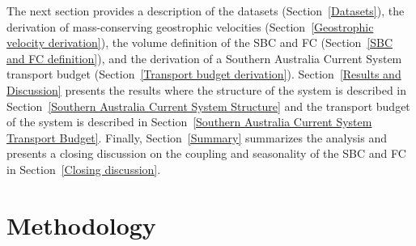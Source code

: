 \documentclass[preprint,3p,review,12pt]{elsarticle}
\begin{document}
The next section provides a description of the datasets (Section~\ref{Datasets}), the derivation of mass-conserving geostrophic velocities (Section~\ref{Geostrophic velocity derivation}), the volume definition of the SBC and FC (Section~\ref{SBC and FC definition}), and the derivation of a Southern Australia Current System transport budget (Section~\ref{Transport budget derivation}). Section~\ref{Results and Discussion} presents the results where the structure of the system is described in Section~\ref{Southern Australia Current System Structure} and the transport budget of the system is described in Section~\ref{Southern Australia Current System Transport Budget}. Finally, Section~\ref{Summary} summarizes the analysis and presents a closing discussion on the coupling and seasonality of the SBC and FC in Section~\ref{Closing discussion}.

\section{Methodology} \label{Methodology}
\end{document}
